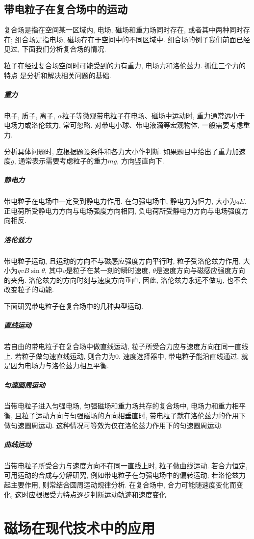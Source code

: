 \documentclass[11pt,a4paper]{ctexbook}
\begin{document}
\subsection{带电粒子在复合场中的运动}

复合场是指在空间某一区域内, 电场, 磁场和重力场同时存在,
或者其中两种同时存在; 组合场是指电场, 磁场存在于空间中的不同区域中.
组合场的例子我们前面已经见过, 下面我们分析复合场的情况.

粒子在经过复合场空间时可能受到的力有重力, 电场力和洛伦兹力. 抓住三个力的特点
是分析和解决相关问题的基础.

\subparagraph{重力} 电子, 质子, 离子, $\alpha$粒子等微观带电粒子在电场、磁场中运动时, 重力通常远小于电场力或洛伦兹力,
常可忽略. 对带电小球、带电液滴等宏观物体, 一般需要考虑重力.

分析具体问题时, 应根据题设条件和各力大小作判断. 如果题目中给出了重力加速度$g$, 通常表示需要考虑粒子的重力$mg$, 方向竖直向下.

\subparagraph{静电力} 带电粒子在电场中一定受到静电力作用. 在匀强电场中, 静电力为恒力,
大小为$qE$. 正电荷所受静电力方向与电场强度方向相同, 负电荷所受静电力方向与电场强度方向相反.

\subparagraph{洛伦兹力} 带电粒子运动, 且运动的方向不与磁感应强度方向平行时, 粒子受洛伦兹力作用,
大小为$qvB\sin\theta$, 其中$v$是粒子在某一刻的瞬时速度, $\theta$是速度方向与磁感应强度方向的夹角. 洛伦兹力的方向时刻与速度方向垂直, 因此, 洛伦兹力永远不做功,
也不会改变粒子的动能.
\bigskip

下面研究带电粒子在复合场中的几种典型运动.
\subparagraph{直线运动} 若自由的带电粒子在复合场中做直线运动, 粒子所受合力应与速度方向在同一直线上.
若粒子做匀速直线运动, 则合力为0. 速度选择器中, 带电粒子能沿直线通过, 就是因为电场力与洛伦兹力相互平衡.

\subparagraph{匀速圆周运动} 当带电粒子进入匀强电场, 匀强磁场和重力场共存的复合场中, 电场力和重力相平衡,
且粒子运动方向与匀强磁场的方向相垂直时, 带电粒子就在洛伦兹力的作用下做匀速圆周运动. 这种情况可等效为仅在洛伦兹力作用下的匀速圆周运动.

\subparagraph{曲线运动} 当带电粒子所受合力与速度方向不在同一直线上时, 粒子做曲线运动.
若合力恒定, 可用运动的合成与分解研究, 例如带电粒子在匀强电场中的偏转运动;
若洛伦兹力起主要作用, 则常结合圆周运动规律分析. 在复合场中, 合力可能随速度变化而变化,
这时应根据受力特点逐步判断运动轨迹和速度变化.

\section{磁场在现代技术中的应用}
\label{电磁科技一节}
\end{document}
